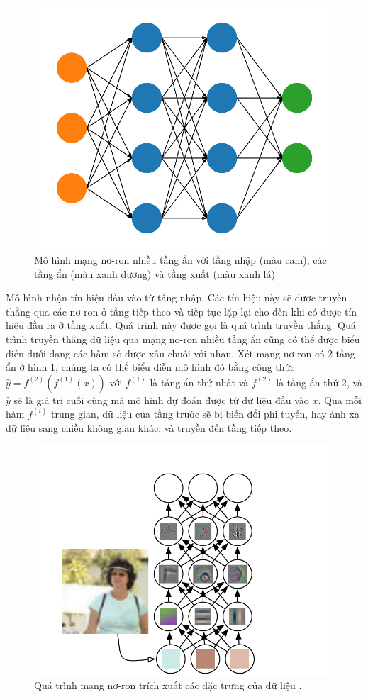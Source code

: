 \begin{figure}[H]
	\centering
	\includegraphics[width=90 mm]{images/dnn.png}
	\caption{Mô hình mạng nơ-ron nhiều tầng ẩn với tầng nhập (màu cam), các tầng ẩn (màu xanh dương) và tầng xuất (màu xanh lá)}
	\label{fig:dnn}
\end{figure}

Mô hình nhận tín hiệu đầu vào từ tầng nhập. Các tín hiệu này sẽ được truyền thẳng qua các nơ-ron ở tầng tiếp theo và tiếp tục lặp lại cho đến khi có được tín hiệu đầu ra ở tầng xuất. Quá trình này được gọi là quá trình truyền thẳng. Quá trình truyền thẳng dữ liệu qua mạng no-ron nhiều tầng ẩn cũng có thể được biểu diễn dưới dạng các hàm số được xâu chuỗi với nhau. Xét mạng nơ-ron có 2 tầng ẩn ở hình \ref{fig:dnn}, chúng ta có thể biểu diễn mô hình đó bằng công thức $\hat{y}=f^{(2)}(f^{(1)}(x))$ với $f^{(1)}$ là tầng ẩn thứ nhất và $f^{(2)}$ là tầng ẩn thứ 2, và $\hat{y}$ sẽ là giá trị cuối cùng mà mô hình dự đoán được từ dữ liệu đầu vào $x$. Qua mỗi hàm $f^{(i)}$ trung gian, dữ liệu của tầng trước sẽ bị biến đổi phi tuyến, hay ánh xạ dữ liệu sang chiều không gian khác, và truyền đến tầng tiếp theo.

\begin{figure}[H]
	\centering
	\includegraphics[width=160 mm]{images/dnn-features.png}
	\caption{Quá trình mạng nơ-ron trích xuất các đặc trưng của dữ liệu \cite{goodfellow2016deeplearning}.}
	\label{fig:dnn-features}
\end{figure}


